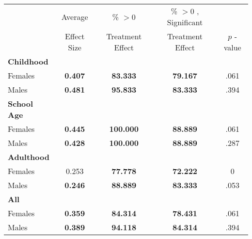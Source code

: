 \begin{tabular}{l c c c c}
\toprule
 & Average & \% $ >0 $ & \% $ >0 $ , Significant & \citet{Rosenbaum_2005_Distribution_JRSS} \\
 & Effect Size & Treatment Effect & Treatment Effect & $ p $ -value \\
\midrule
\textbf{Childhood} & & & & \\
\quad Females &  \textbf{    0.407} & \textbf{   83.333} & \textbf{   79.167} & .061 \\
\quad Males &  \textbf{    0.481} & \textbf{   95.833} & \textbf{   83.333} & .394 \\
\midrule
\textbf{School Age} & & & & \\
\quad Females &  \textbf{    0.445} & \textbf{  100.000} & \textbf{   88.889} & .061 \\
\quad Males &  \textbf{    0.428} & \textbf{  100.000} & \textbf{   88.889} & .287 \\
\midrule
\textbf{Adulthood} & & & & \\
\quad Females &      0.253 & \textbf{   77.778} & \textbf{   72.222} & 0 \\
\quad Males &  \textbf{    0.246} & \textbf{   88.889} & \textbf{   83.333} & .053 \\
\midrule
\textbf{All} & & & & \\
\quad Females &  \textbf{    0.359} & \textbf{   84.314} & \textbf{   78.431} & .061 \\
\quad Males &  \textbf{    0.389} & \textbf{   94.118} & \textbf{   84.314} & .394 \\
\bottomrule
\end{tabular}

